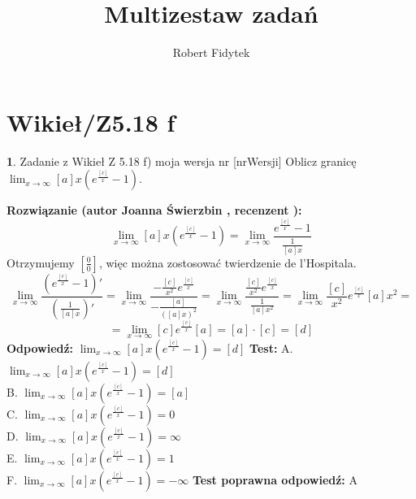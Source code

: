 \documentclass[12pt, a4paper]{article}
\title{Multizestaw zadań}
\author{Robert Fidytek}
\date{}
\theoremstyle{definition} %
\newtheorem{zad}{}
\newcommand{\kategoria}[1]{\section{#1}} %
\newcommand{\zadStart}[1]{\begin{zad}#1\newline} %
\newcommand{\zadStop}{\end{zad}}   %
\newcommand{\rozwStart}[2]{\noindent \textbf{Rozwiązanie (autor #1 , recenzent #2): }\newline} %
\newcommand{\rozwStop}{\newline}                                            %
\newcommand{\odpStart}{\noindent \textbf{Odpowiedź:}\newline}    %
\newcommand{\odpStop}{\newline}                                             %
\newcommand{\testStart}{\noindent \textbf{Test:}\newline} %
\newcommand{\testStop}{\newline} %
\newcommand{\kluczStart}{\noindent \textbf{Test poprawna odpowiedź:}\newline} %
\newcommand{\kluczStop}{\newline} %
\begin{document}
\maketitle


\kategoria{Wikieł/Z5.18 f}
\zadStart{Zadanie z Wikieł Z 5.18 f) moja wersja nr [nrWersji]}
Oblicz granicę $\lim_{x \rightarrow \infty} [a]x \left( e^{\frac{[c]}{x}}-1 \right) $.
\zadStop
\rozwStart{Joanna Świerzbin}{}
$$\lim_{x \rightarrow \infty} [a]x \left( e^{\frac{[c]}{x}}-1 \right) = \lim_{x \rightarrow \infty} \frac{e^{\frac{[c]}{x}}-1}{\frac{1}{[a]x}}  $$
Otrzymujemy $\left[ \frac{0}{0} \right]$, więc można zostosować twierdzenie de l'Hospitala.
$$ \lim_{x \rightarrow \infty} \frac{\left(e^{\frac{[c]}{x}}-1\right)'}{\left(\frac{1}{[a]x}\right)'} = \lim_{x \rightarrow \infty} \frac{-\frac{[c]}{x^2}e^{\frac{[c]}{x}}}{-\frac{[a]}{([a]x)^2}} = \lim_{x \rightarrow \infty} \frac{\frac{[c]}{x^2}e^{\frac{[c]}{x}}}{\frac{1}{[a]x^2}} = \lim_{x \rightarrow \infty} \frac{[c]}{x^2}e^{\frac{[c]}{x}}{[a]x^2} =$$
$$= \lim_{x \rightarrow \infty} [c]e^{\frac{[c]}{x}}[a]=[a]\cdot[c]=[d]$$
\rozwStop
\odpStart
$\lim_{x \rightarrow \infty} [a]x \left( e^{\frac{[c]}{x}}-1 \right) = [d] $
\odpStop
\testStart
A. $\lim_{x \rightarrow \infty} [a]x \left( e^{\frac{[c]}{x}}-1 \right) = [d] $\\
B. $\lim_{x \rightarrow \infty} [a]x \left( e^{\frac{[c]}{x}}-1 \right) = [a] $ \\
C. $\lim_{x \rightarrow \infty} [a]x \left( e^{\frac{[c]}{x}}-1 \right) = 0 $ \\
D. $\lim_{x \rightarrow \infty} [a]x \left( e^{\frac{[c]}{x}}-1 \right) = \infty $\\
E. $\lim_{x \rightarrow \infty} [a]x \left( e^{\frac{[c]}{x}}-1 \right) = 1 $\\
F. $\lim_{x \rightarrow \infty} [a]x \left( e^{\frac{[c]}{x}}-1 \right) = -\infty $
\testStop
\kluczStart
A
\kluczStop
\end{document}
